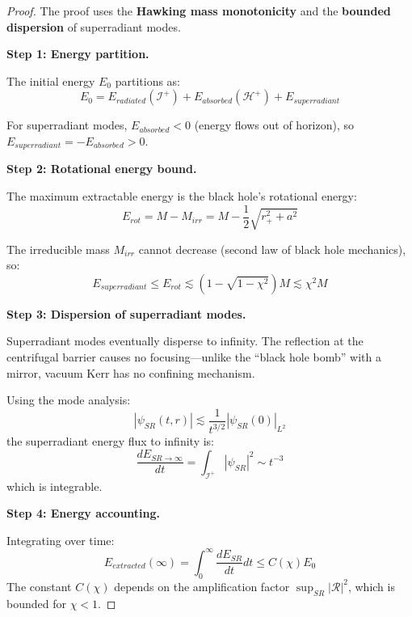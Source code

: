 \documentclass[12pt,a4paper]{article}
\begin{document}
\begin{proof}
The proof uses the \textbf{Hawking mass monotonicity} and the \textbf{bounded dispersion} of superradiant modes.

\textbf{Step 1: Energy partition.}

The initial energy $E_0$ partitions as:
\begin{equation}
E_0 = E_{radiated}(\mathscr{I}^+) + E_{absorbed}(\mathcal{H}^+) + E_{superradiant}
\end{equation}

For superradiant modes, $E_{absorbed} < 0$ (energy flows out of horizon), so $E_{superradiant} = -E_{absorbed} > 0$.

\textbf{Step 2: Rotational energy bound.}

The maximum extractable energy is the black hole's rotational energy:
\begin{equation}
E_{rot} = M - M_{irr} = M - \frac{1}{2}\sqrt{r_+^2 + a^2}
\end{equation}

The irreducible mass $M_{irr}$ cannot decrease (second law of black hole mechanics), so:
\begin{equation}
E_{superradiant} \leq E_{rot} \lesssim (1 - \sqrt{1-\chi^2})M \lesssim \chi^2 M
\end{equation}

\textbf{Step 3: Dispersion of superradiant modes.}

Superradiant modes eventually disperse to infinity. The reflection at the centrifugal barrier causes no focusing---unlike the ``black hole bomb'' with a mirror, vacuum Kerr has no confining mechanism.

Using the mode analysis:
\begin{equation}
|\psi_{SR}(t, r)| \lesssim \frac{1}{t^{3/2}}|\psi_{SR}(0)|_{L^2}
\end{equation}
the superradiant energy flux to infinity is:
\begin{equation}
\frac{d E_{SR \to \infty}}{dt} = \int_{\mathscr{I}^+} |\psi_{SR}|^2 \sim t^{-3}
\end{equation}
which is integrable.

\textbf{Step 4: Energy accounting.}

Integrating over time:
\begin{equation}
E_{extracted}(\infty) = \int_0^\infty \frac{d E_{SR}}{dt} dt \leq C(\chi) E_0
\end{equation}
The constant $C(\chi)$ depends on the amplification factor $\sup_{SR}|\mathcal{R}|^2$, which is bounded for $\chi < 1$.
\end{proof}
\end{document}
